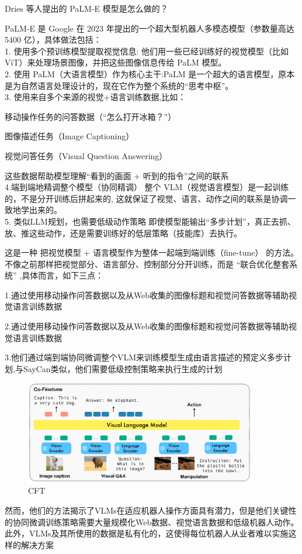 \documentclass[12pt]{article}
\begin{document}
\begin{tcolorbox}[colback=blue!5!white, colframe=blue!75!black, title=以下内容来自ChatGTP]
Dries 等人提出的 PaLM-E 模型是怎么做的？

PaLM-E 是 Google 在 2023 年提出的一个超大型机器人多模态模型（参数量高达 5400 亿），具体做法包括：
\\1. 使用多个预训练模型提取视觉信息:
他们用一些已经训练好的视觉模型（比如 ViT）来处理场景图像，并把这些图像信息传给 PaLM 模型。
\\2. 使用 PaLM（大语言模型）作为核心主干:PaLM 是一个超大的语言模型，原本是为自然语言处理设计的，现在它作为整个系统的“思考中枢”。
\\3. 使用来自多个来源的视觉+语言训练数据,比如：

\hspace*{2em}移动操作任务的问答数据（“怎么打开冰箱？”） 

\hspace*{2em}图像描述任务（Image Captioning）

\hspace*{2em}视觉问答任务（Visual Question Answering）

这些数据帮助模型理解“看到的画面 + 听到的指令”之间的联系
\\4.端到端地精调整个模型（协同精调）
整个 VLM（视觉语言模型）是一起训练的，不是分开训练后拼起来的,
这就保证了视觉、语言、动作之间的联系是协调一致地学出来的。
\\5. 类似LLM规划，也需要低级动作策略
即使模型能输出“多步计划”，真正去抓、放、推这些动作，还是需要训练好的低层策略（技能库）去执行。
\end{tcolorbox}

这是一种 把视觉模型 + 语言模型作为整体一起端到端训练（fine-tune） 的方法。
不像之前那样把视觉部分、语言部分、控制部分分开训练，而是 “联合优化整套系统” ,具体而言，如下三点：

1.通过使用移动操作问答数据以及从Web收集的图像标题和视觉问答数据等辅助视觉语言训练数据

2.通过使用移动操作问答数据以及从Web收集的图像标题和视觉问答数据等辅助视觉语言训练数据

3.他们通过端到端协同微调整个VLM来训练模型生成由语言描述的预定义多步计划,与SayCan类似，他们需要低级控制策略来执行生成的计划

\begin{figure}[ht]  %
\centering
\includegraphics[width=0.9\textwidth]{pic3.png}
\caption{CFT}
\end{figure}
然而，他们的方法揭示了VLMs在适应机器人操作方面具有潜力，但是他们关键性的协同微调训练策略需要大量规模化Web数据、视觉语言数据和低级机器人动作。此外，VLMs及其所使用的数据是私有化的，这使得每位机器人从业者难以实施这样的解决方案
\end{document}
